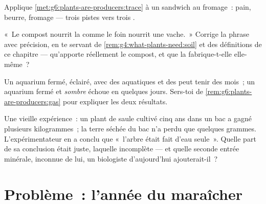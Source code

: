 \begin{exercise}[$\star\star$]\label{exo:g6:plants-are-producers:9}
Applique \cref{met:g6:plants-are-producers:trace} à un sandwich au
fromage~: pain, beurre, fromage --- trois pistes vers trois
.
\end{exercise}

\begin{exercise}[$\star\star$]\label{exo:g6:plants-are-producers:10}
«~Le compost nourrit la  comme le foin nourrit une vache.~»
Corrige la phrase avec précision, en te servant de
\cref{rem:g4:what-plants-need:soil} et des définitions de ce
chapitre --- qu'apporte réellement le compost, et que la 
fabrique-t-elle elle-même~?
\end{exercise}

\begin{exercise}[$\star\star$]\label{exo:g6:plants-are-producers:11}
Un aquarium fermé, éclairé, avec des  aquatiques et des
 peut tenir des mois~; un aquarium fermé et \emph{sombre}
échoue en quelques jours. Sers-toi de
\cref{rem:g6:plants-are-producers:gas} pour expliquer les deux
résultats.
\end{exercise}

\begin{exercise}[$\star\star\star$]\label{exo:g6:plants-are-producers:12}
Une vieille expérience~: un plant de saule cultivé cinq ans dans un
bac a gagné plusieurs kilogrammes~; la terre séchée du bac n'a perdu
que quelques grammes. L'expérimentateur en a conclu que «~l'arbre
était fait d'eau seule~». Quelle part de sa conclusion était juste,
laquelle incomplète --- et quelle seconde entrée minérale, inconnue
de lui, un biologiste d'aujourd'hui ajouterait-il~?
\end{exercise}

\section{Problème~: l'année du maraîcher}

